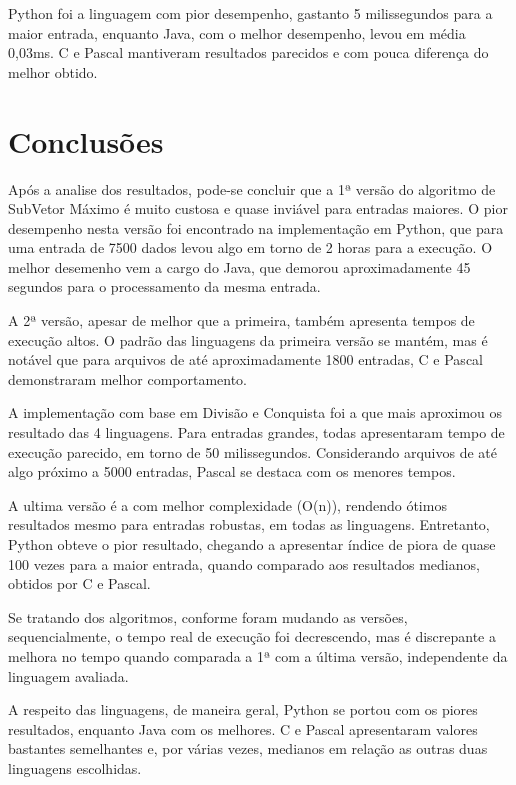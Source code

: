 \documentclass[
	12pt,				%
	oneside,   	        %
	a4paper,			%
	english,			%
	french,				%
	spanish,			%
	brazil,				%
	]{pacotes/abntex2}
\begin{document}
    Python foi a linguagem com pior desempenho, gastanto 5 milissegundos para a maior entrada, enquanto Java, com o melhor desempenho, levou em média 0,03ms. C e Pascal mantiveram resultados parecidos e com pouca diferença do melhor obtido.
    
\section{Conclusões}
\label{sec:conclusoes}

    Após a analise dos resultados, pode-se concluir que a 1ª versão do algoritmo de SubVetor Máximo é muito custosa e quase inviável para entradas maiores. O pior desempenho nesta versão foi encontrado na implementação em Python, que para uma entrada de 7500 dados levou algo em torno de 2 horas para a execução. O melhor desemenho vem a cargo do Java, que demorou aproximadamente 45 segundos para o processamento da mesma entrada.
    
    A 2ª versão, apesar de melhor que a primeira, também apresenta tempos de execução altos. O padrão das linguagens da primeira versão se mantém, mas é notável que para arquivos de até aproximadamente 1800 entradas, C e Pascal demonstraram melhor comportamento.
    
    A implementação com base em Divisão e Conquista foi a que mais aproximou os resultado das 4 linguagens. Para entradas grandes, todas apresentaram tempo de execução parecido, em torno de 50 milissegundos. Considerando arquivos de até algo próximo a 5000 entradas, Pascal se destaca com os menores tempos.
    
    A ultima versão é a com melhor complexidade (O(n)), rendendo ótimos resultados mesmo para entradas robustas, em todas as linguagens. Entretanto, Python obteve o pior resultado, chegando a apresentar índice de piora de quase 100 vezes para a maior entrada, quando comparado aos resultados medianos, obtidos por C e Pascal.
    
    Se tratando dos algoritmos, conforme foram mudando as versões, sequencialmente, o tempo real de execução foi decrescendo, mas é discrepante a melhora no tempo quando comparada a 1ª com a última versão, independente da linguagem avaliada. 
    
    A respeito das linguagens, de maneira geral, Python se portou com os piores resultados, enquanto Java com os melhores. C e Pascal apresentaram valores bastantes semelhantes e, por várias vezes, medianos em relação as outras duas linguagens escolhidas.
    
    

\postextual
\renewcommand{\bibsection}{%
\section{\bibname}
\bibmark
\prebibhook}


\end{document}

